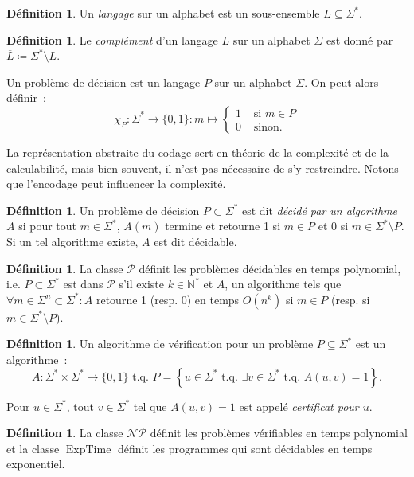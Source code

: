 \documentclass{article}
\theoremstyle{definition}
\newtheorem{déf}[thm]{Définition}
\theoremstyle{remark}
\newcommand{\N}{\mathbb N}
\newcommand{\tq}{\text{ t.q. }}
\newcommand{\NP}{\mathcal {NP}}
\DeclareMathOperator{\ExpTime}{ExpTime}
\begin{document}
	\begin{déf} Un \textit{langage} sur un alphabet est un sous-ensemble $L \subseteq \Sigma^*$.
	\end{déf}

	\begin{déf} Le \textit{complément} d'un langage $L$ sur un alphabet $\Sigma$ est donné par $\overline L \coloneqq \Sigma^* \setminus L$.
	\end{déf}

	Un problème de décision est un langage $P$ sur un alphabet $\Sigma$. On peut alors définir~:
	\[\chi_P : \Sigma^* \to \{0, 1\} : m \mapsto \begin{cases}1 &\text{ si } m \in P \\0 &\text{ sinon}.\end{cases}\]

	La représentation abstraite du codage sert en théorie de la complexité et de la calculabilité, mais bien souvent, il n'est pas nécessaire de s'y restreindre.
	Notons que l'encodage peut influencer la complexité.

	\begin{déf} Un problème de décision $P \subset \Sigma^*$ est dit \textit{décidé par un algorithme $A$} si pour tout $m \in \Sigma^*$,
	$A(m)$ termine et retourne 1 si $m \in P$ et 0 si $m \in \Sigma^* \setminus P$. Si un tel algorithme existe, $A$ est dit décidable.
	\end{déf}

	\begin{déf} La classe $\mathcal P$ définit les problèmes décidables en temps polynomial, i.e. $P \subset \Sigma^*$ est dans $\mathcal P$ s'il existe
	$k \in \N^*$ et $A$, un algorithme tels que $\forall m \in \Sigma^n \subset \Sigma^* : A$ retourne 1 (resp. 0) en temps $O(n^k)$ si
	$m \in P$ (resp. si $m \in \Sigma^* \setminus P$).
	\end{déf}

	\begin{déf} Un algorithme de vérification pour un problème $P \subseteq \Sigma^*$ est un algorithme~:
	\[A : \Sigma^* \times \Sigma^* \to \{0, 1\} \tq P = \left\{u \in \Sigma^* \tq \exists v \in \Sigma^* \tq A(u, v) = 1\right\}.\]

	Pour $u \in \Sigma^*$, tout $v \in \Sigma^*$ tel que $A(u, v) = 1$ est appelé \textit{certificat pour $u$}.
	\end{déf}

	\begin{déf} La classe $\NP$ définit les problèmes vérifiables en temps polynomial et la classe $\ExpTime$ définit les programmes qui sont décidables
	en temps exponentiel.
	\end{déf}
\end{document}
